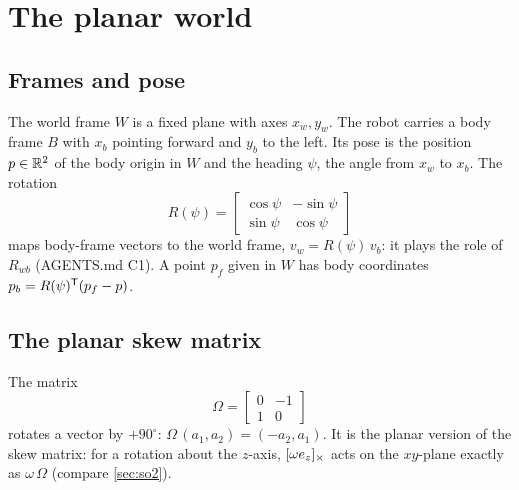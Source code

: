 \section{The planar world}
\label{sec:planar-world}

\subsection{Frames and pose}

The world frame $W$ is a fixed plane with axes $x_w, y_w$. The robot carries a body frame $B$ with $x_b$ pointing forward and
$y_b$ to the left. Its pose is the position $p \in \mathbb{R}^2$ of the body origin in $W$ and the heading $\psi$, the angle from $x_w$ to $x_b$. The
rotation
\begin{equation}
  R(\psi) = \begin{bmatrix} \cos\psi & -\sin\psi \\ \sin\psi & \cos\psi \end{bmatrix}
\end{equation}
maps body-frame vectors to the world frame, $v_w = R(\psi)\,v_b$: it plays the role of $R_{wb}$ (AGENTS.md C1). A point $p_f$ given in $W$ has
body coordinates $p_b = R(\psi)^{\mathsf{T}}(p_f - p)$.

\subsection{The planar skew matrix}

The matrix
\begin{equation}
  \Omega = \begin{bmatrix} 0 & -1 \\ 1 & 0 \end{bmatrix}
\end{equation}
rotates a vector by $+90^\circ$: $\Omega\,(a_1, a_2) = (-a_2, a_1)$. It is the planar version of the skew matrix: for a rotation about the
$z$-axis, $[\omega e_z]_{\times}$ acts on the $xy$-plane exactly as $\omega\,\Omega$ (compare \cref{sec:so2}).

